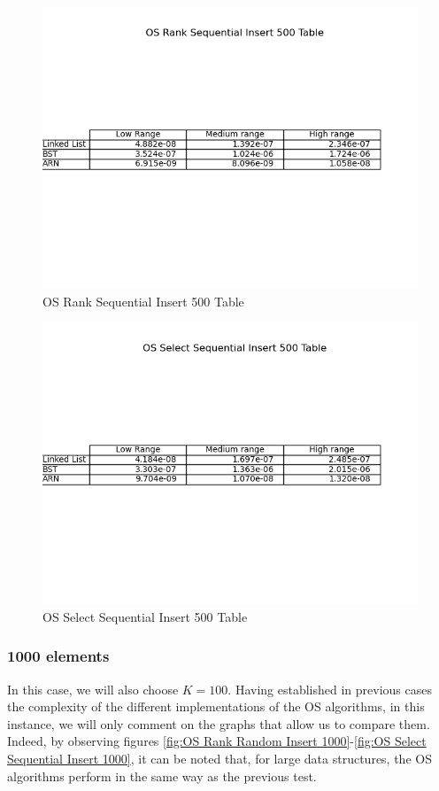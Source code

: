 \documentclass[11pt]{article}
\begin{document}
 \begin{figure}[H]
  \centering
  \includegraphics[width=0.8\linewidth]{Images/500/OS Rank Sequential Insert 500 Table.png}
  \caption{OS Rank Sequential Insert 500 Table }
  \label{fig:OS Rank Sequential Insert 500 Table}
\end{figure}
 \begin{figure}[H]
  \centering
  \includegraphics[width=0.8\linewidth]{Images/500/OS Select Sequential Insert 500 Table.png}
  \caption{OS Select Sequential Insert 500 Table }
  \label{fig:OS Select Sequential Insert 500 Table}
\end{figure}
\subsubsection{1000 elements}

In this case, we will also choose $K = 100$. Having established in previous cases the complexity of the different implementations of the OS algorithms, in this instance, we will only comment on the graphs that allow us to compare them. Indeed, by observing figures \ref{fig:OS Rank Random Insert 1000}-\ref{fig:OS Select Sequential Insert 1000}, it can be noted that, for large data structures, the OS algorithms perform in the same way as the previous test.
\end{document}

